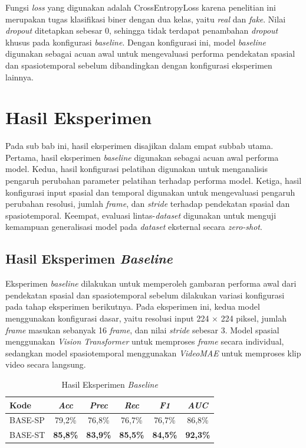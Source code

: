 Fungsi \textit{loss} yang digunakan adalah CrossEntropyLoss karena penelitian ini merupakan tugas klasifikasi biner dengan dua kelas, yaitu \textit{real} dan \textit{fake}. Nilai \textit{dropout} ditetapkan sebesar 0, sehingga tidak terdapat penambahan \textit{dropout} khusus pada konfigurasi \textit{baseline}. Dengan konfigurasi ini, model \textit{baseline} digunakan sebagai acuan awal untuk mengevaluasi performa pendekatan spasial dan spasiotemporal sebelum dibandingkan dengan konfigurasi eksperimen lainnya.

\section{Hasil Eksperimen} \label{IV.Eksperimen}
Pada sub bab ini, hasil eksperimen disajikan dalam empat subbab utama. Pertama, hasil eksperimen \textit{baseline} digunakan sebagai acuan awal performa model. Kedua, hasil konfigurasi pelatihan digunakan untuk menganalisis pengaruh perubahan parameter pelatihan terhadap performa model. Ketiga, hasil konfigurasi input spasial dan temporal digunakan untuk mengevaluasi pengaruh perubahan resolusi, jumlah \textit{frame}, dan \textit{stride} terhadap pendekatan spasial dan spasiotemporal. Keempat, evaluasi lintas-\textit{dataset} digunakan untuk menguji kemampuan generalisasi model pada \textit{dataset} eksternal secara \textit{zero-shot}.

\subsection{Hasil Eksperimen \textit{Baseline}} \label{IV.Eksperimen_Baseline}
Eksperimen \textit{baseline} dilakukan untuk memperoleh gambaran performa awal dari pendekatan spasial dan spasiotemporal sebelum dilakukan variasi konfigurasi pada tahap eksperimen berikutnya. Pada eksperimen ini, kedua model menggunakan konfigurasi dasar, yaitu resolusi input 224 $\times$ 224 piksel, jumlah \textit{frame} masukan sebanyak 16 \textit{frame}, dan nilai \textit{stride} sebesar 3. Model spasial menggunakan \textit{Vision Transformer} untuk memproses \textit{frame} secara individual, sedangkan model spasiotemporal menggunakan \textit{VideoMAE} untuk memproses klip video secara langsung.

\begin{table}[htbp]
	\centering
	\caption{Hasil Eksperimen \textit{Baseline}}
	\label{table:4.baseline}
	\begin{tabular}{lccccc}
		\toprule
		\textbf{Kode} &
		\textbf{\textit{Acc}} &
		\textbf{\textit{Prec}} &
		\textbf{\textit{Rec}} &
		\textbf{\textit{F1}} &
		\textbf{\textit{AUC}} \\
			\midrule
			BASE-SP & 79,2\% & 76,8\% & 76,7\% & 76,7\% & 86,8\% \\
			BASE-ST & \textbf{85,8\%} & \textbf{83,9\%} & \textbf{85,5\%} & \textbf{84,5\%} & \textbf{92,3\%} \\
		\bottomrule
	\end{tabular}
\end{table}

